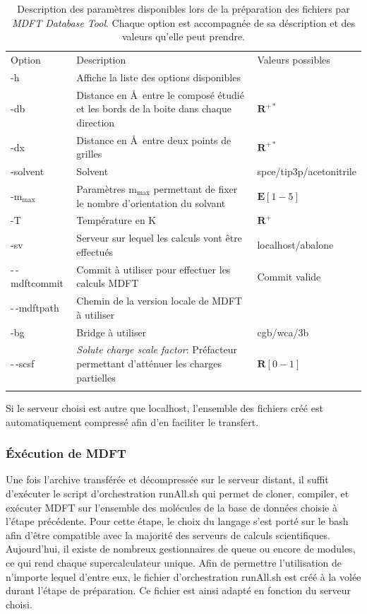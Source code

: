 \begin{table}
  \begin{tabular}{ l p{10cm} p{4cm}}
    \hline & \\[-1em]\hline
    Option   & Description  & Valeurs possibles \\
    \hline
    -h  & Affiche la liste des options disponibles & \\
    -db & Distance en \AA\ entre le composé étudié et les bords de la boite dans chaque direction & $\mathbf{R}^{+*}$ \\
    -dx & Distance en \AA\ entre deux points de grilles & $\mathbf{R}^{+*}$ \\
    -solvent & Solvent & spce/tip3p/acetonitrile\\
    -$\mathrm{m}_\mathrm{max}$ & Paramètres $\mathrm{m}_\mathrm{max}$ permettant de fixer le nombre d'orientation du solvant & $\mathbf{E}[1-5]$ \\
    -T & Température en K & $\mathbf{R}^{+}$ \\
    -sv & Serveur sur lequel les calculs vont être effectués & localhost/abalone \\
    -\,-mdftcommit & Commit à utiliser pour effectuer les calculs MDFT & Commit valide \\
    -\,-mdftpath & Chemin de la version locale de MDFT à utiliser & \\
    -bg & Bridge à utiliser & cgb/wca/3b \\
    -\,-scsf & \textit{Solute charge scale factor}: Préfacteur permettant d'atténuer les charges partielles & $\mathbf{R}[0-1]$ \\
    \hline & \\[-1em]\hline
  \end{tabular}
  \caption[Description des paramètres disponibles lors de la préparation des fichiers par \textit{MDFT Database Tool}.]{Description des paramètres disponibles lors de la préparation des fichiers par \textit{MDFT Database Tool}. Chaque option est accompagnée de sa déscription et des valeurs qu'elle peut prendre.}
  \label{tab:processParameters}  
\end{table}

Si le serveur choisi est autre que localhost, l'ensemble des fichiers créé est automatiquement compressé afin d'en faciliter le transfert.


\subsubsection{\'Exécution de MDFT}
Une fois l'archive transférée et décompressée sur le serveur distant, il suffit d’exécuter le script d'orchestration runAll.sh qui permet de cloner, compiler, et exécuter MDFT sur l'ensemble des molécules de la base de données choisie à l'étape précédente. Pour cette étape, le choix du langage s'est porté sur le bash afin d'être compatible avec la majorité des serveurs de calculs scientifiques. Aujourd'hui, il existe de nombreux gestionnaires de queue ou encore de modules, ce qui rend chaque supercalculateur unique. Afin de permettre l'utilisation de n'importe lequel d'entre eux, le fichier d'orchestration runAll.sh est créé à la volée durant l'étape de préparation. Ce fichier est ainsi adapté en fonction du serveur choisi.


